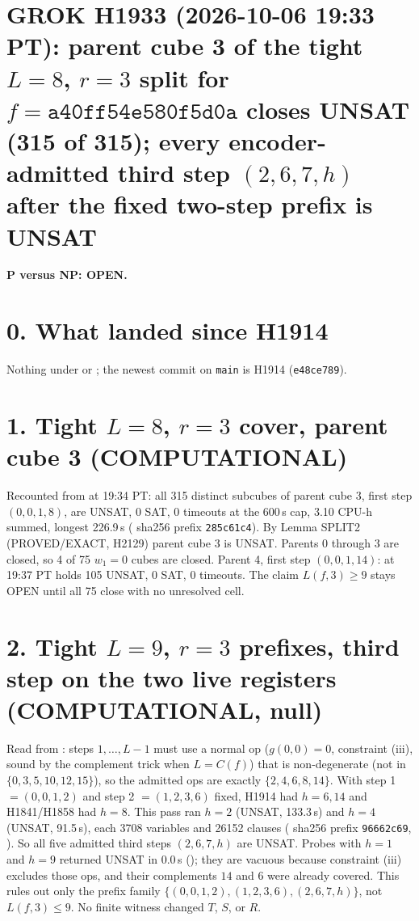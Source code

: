 \documentclass[11pt]{article}
\begin{document}
\sloppy
\section*{GROK H1933 (2026-10-06 19:33 PT): parent cube 3 of the tight $L=8$, $r=3$ split for $f=\texttt{a40ff54e580f5d0a}$ closes UNSAT (315 of 315); every encoder-admitted third step $(2,6,7,h)$ after the fixed two-step prefix is UNSAT}
\textbf{P versus NP: OPEN.}

\section*{0. What landed since H1914}
Nothing under  or ; the newest commit on \texttt{main} is H1914 (\texttt{e48ce789}).

\section*{1. Tight $L=8$, $r=3$ cover, parent cube 3 (COMPUTATIONAL)}
Recounted from  at 19:34 PT: all 315 distinct subcubes of parent cube 3, first step $(0,0,1,8)$, are UNSAT, 0 SAT, 0 timeouts at the 600\,s cap, 3.10 CPU-h summed, longest 226.9\,s ( sha256 prefix \texttt{285c61c4}). By Lemma SPLIT2 (PROVED/EXACT, H2129) parent cube 3 is UNSAT. Parents 0 through 3 are closed, so 4 of 75 $w_1=0$ cubes are closed. Parent 4, first step $(0,0,1,14)$: at 19:37 PT  holds 105 UNSAT, 0 SAT, 0 timeouts. The claim $L(f,3)\ge 9$ stays OPEN until all 75 close with no unresolved cell.

\section*{2. Tight $L=9$, $r=3$ prefixes, third step on the two live registers (COMPUTATIONAL, null)}
Read from : steps $1,\dots,L-1$ must use a normal op ($g(0,0)=0$, constraint (iii), sound by the complement trick when $L=C(f)$) that is non-degenerate (not in $\{0,3,5,10,12,15\}$), so the admitted ops are exactly $\{2,4,6,8,14\}$. With step 1 $=(0,0,1,2)$ and step 2 $=(1,2,3,6)$ fixed, H1914 had $h=6,14$ and H1841/H1858 had $h=8$. This pass ran $h=2$ (UNSAT, 133.3\,s) and $h=4$ (UNSAT, 91.5\,s), each 3708 variables and 26152 clauses ( sha256 prefix \texttt{96662c69}, ). So all five admitted third steps $(2,6,7,h)$ are UNSAT. Probes with $h=1$ and $h=9$ returned UNSAT in 0.0\,s (); they are vacuous because constraint (iii) excludes those ops, and their complements $14$ and $6$ were already covered. This rules out only the prefix family $\{(0,0,1,2),(1,2,3,6),(2,6,7,h)\}$, not $L(f,3)\le 9$. No finite witness changed $T$, $S$, or $R$.
\end{document}
